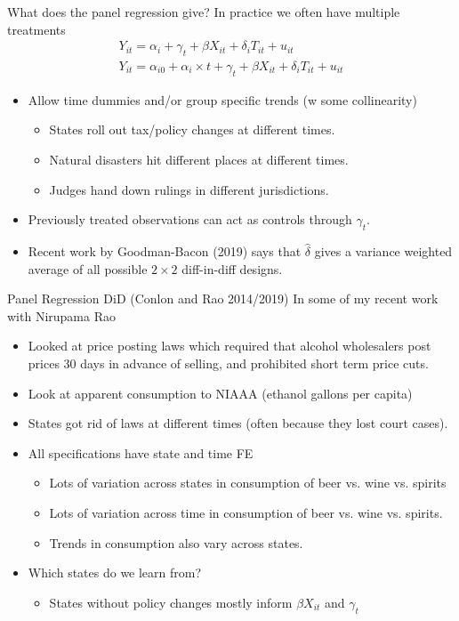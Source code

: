 \documentclass[xcolor=pdftex,dvipsnames,table,mathserif,aspectratio=169]{beamer}
\begin{document}
\begin{frame}{What does the panel regression give?}
In practice we often have \alert{multiple treatments}
\begin{align*}
 Y_{it} =\alpha_i +\gamma_t +\beta X_{it} + \delta_i T_{it}  + u_{it}\\
 Y_{it} =\alpha_{i0} + \alpha_i \times t +\gamma_t +\beta X_{it} + \delta_i T_{it}  + u_{it}
 \end{align*}
  \begin{itemize}
 \item Allow time dummies and/or group specific trends (w some collinearity)
 \begin{itemize}
\item States roll out tax/policy changes at different times.
\item Natural disasters hit different places at different times.
\item Judges hand down rulings in different jurisdictions.
\end{itemize}
\item Previously treated observations can act as \alert{controls} through $\gamma_t$.
\item Recent work by Goodman-Bacon (2019) says that $\widehat{\delta}$ gives a variance weighted average of all possible $2\times 2$ diff-in-diff designs.
\end{itemize}

\end{frame}

\begin{frame}{Panel Regression DiD (Conlon and Rao 2014/2019)}
In some of my recent work with Nirupama Rao
\begin{itemize}
\item Looked at \alert{price posting laws} which required that alcohol wholesalers post prices 30 days in advance of selling, and prohibited short term price cuts.
\item Look at apparent consumption to NIAAA (ethanol gallons per capita)
\item States got rid of laws at different times (often because they lost court cases).
\item All specifications have state and time FE
\begin{itemize}
\item Lots of variation across states in consumption of beer vs. wine vs. spirits
\item Lots of variation across time in consumption of beer vs. wine vs. spirits.
\item Trends in consumption also vary across states.
\end{itemize}
\item Which states do we learn from?
\begin{itemize}
\item States without policy changes mostly inform $\beta X_{it}$ and $\gamma_t$
\end{itemize}
\end{itemize}
\end{frame}
\end{document}

